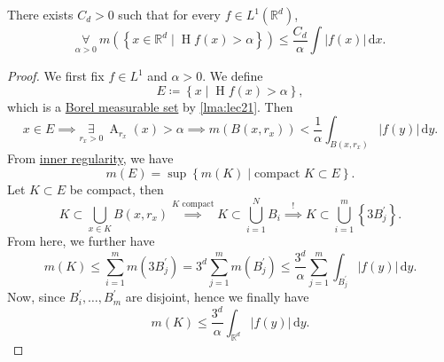 \begin{theorem}\label{thm:HL-maximal-inequality}
	There exists \(C_{d} >0\) such that for every \(f\in L^1(\mathbb{R} ^d)\),
	\[
		\underset{\alpha >0}{\forall }\ m\left(\left\{x\in \mathbb{R} ^d\mid \operatorname{H}f(x) > \alpha  \right\}\right) \leq \frac{C_{d} }{\alpha }\int \left\vert f(x) \right\vert \,\mathrm{d} x.
	\]
\end{theorem}
\begin{proof}
	We first fix \(f\in L^1\) and \(\alpha >0\). We define
	\[
		E\coloneqq \left\{x\mid \operatorname{H}f (x) > \alpha \right\},
	\]
	which is a \hyperref[def:measurable-set]{Borel measurable set} by \autoref{lma:lec21}. Then
	\[
		x\in E\implies \underset{r_{x} >0}{\exists } \ \operatorname{A} _{r_{x} }(x)> \alpha \implies m(B(x, r_{x} ))< \frac{1}{\alpha }\int _{B(x, r_{x} )}\left\vert f(y) \right\vert \,\mathrm{d} y.
	\]
	From \hyperref[thm:inner-regularity]{inner regularity}, we have
	\[
		m(E) = \sup \left\{m(K)\mid \text{compact }K\subset E \right\}.
	\]
	Let \(K\subset E\) be compact, then
	\[
		K\subset \bigcup\limits_{x\in K}B(x, r_{x} ) \overset{K \text{ compact} }{\implies } K\subset \bigcup\limits_{i=1}^{N} B_{i} \overset{\hyperref[lma:Vitali-type-covering-lemma]{!}}{\implies} K\subset \bigcup\limits_{i=1}^{m} \left\{3 B_{j} ^\prime \right\}.
	\]
	From here, we further have
	\[
		m(K) \leq \sum\limits_{i=1}^{m} m(3 B_{j} ^\prime ) = 3^d \sum\limits_{j=1}^{m} m(B_{j} ^\prime ) \leq \frac{3^d}{\alpha }\sum\limits_{j=1}^{m} \int _{B_{j} ^\prime }\left\vert f(y) \right\vert \,\mathrm{d}y.
	\]
	Now, since \(B^\prime _{i} , \dots , B^\prime _{m}  \) are disjoint, hence we finally have
	\[
		m(K) \leq \frac{3^d}{\alpha }\int _{\mathbb{R} ^d}\left\vert f(y) \right\vert \,\mathrm{d} y.
	\]
\end{proof}